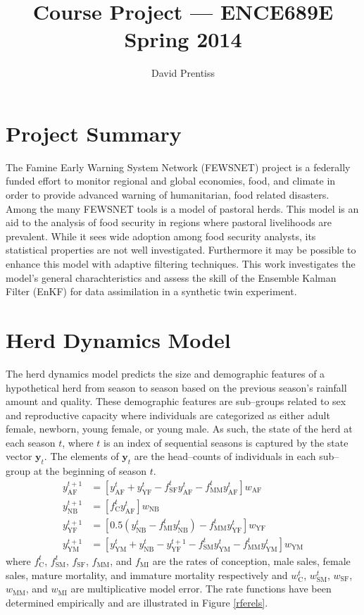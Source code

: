\documentclass[fleqn, letterpaper]{amsart}
\title{Course Project --- ENCE689E Spring 2014}
\author{David Prentiss}
\newcommand{\vecy}{\mathbf{y}}
\begin{document}
\maketitle

\section{Project Summary}

The Famine Early Warning System Network (FEWSNET) project is a federally funded effort to monitor regional and global economies, food, and climate in order to provide advanced warning of humanitarian, food related disasters.
Among the many FEWSNET tools is a model of pastoral herds. This model\cite{fewsnet} is an aid to the analysis of food security in regions where pastoral livelihoods are prevalent. While it sees wide adoption among food security analysts, its statistical properties are not well investigated.
Furthermore it may be possible to enhance this model with adaptive filtering techniques.
This work investigates the model's general charachteristics and assess the skill of the Ensemble Kalman Filter (EnKF) for data assimilation in a synthetic twin experiment.

\section{Herd Dynamics Model}

The herd dynamics model predicts the size and demographic features of a hypothetical herd from season to season based on the previous season's rainfall amount and quality.
These demographic features are sub--groups related to sex and reproductive capacity where individuals are categorized as either adult female, newborn, young female, or young male.
As such, the state of the herd at each season $t$, where $t$ is an index of sequential seasons is captured by the state vector $\vecy_t$.
The elements of $\vecy_t$ are the head--counts of individuals in each sub--group at the beginning of season $t$.
\begin{align}
y_{\text{AF}}^{t+1} &= [y_{\text{AF}}^t + y_{\text{YF}}^t - f_{\text{SF}}^ty_{\text{AF}}^t - f_{\text{MM}}^ty_{\text{AF}}^t]w_{\text{AF}}\\
y_{\text{NB}}^{t+1} &= [f_{\text{C}}^ty_{\text{AF}}^t]w_{\text{NB}}\\
y_{\text{YF}}^{t+1} &= [0.5(y_{\text{NB}}^t - f_{\text{MI}}^ty_{\text{NB}}^t) - f_{\text{MM}}^ty_{\text{YF}}^t]w_{\text{YF}}\\
y_{\text{YM}}^{t+1} &= [y_{\text{YM}}^t + y_{\text{NB}}^t - y_{\text{YF}}^{t+1} - f_{\text{SM}}^ty_{\text{YM}}^t - f_{\text{MM}}^ty_{\text{YM}}^t]w_{\text{YM}}
\end{align}
where $f_{\text{C}}^t$, $f_{\text{SM}}^t$, $f_{\text{SF}}$, $f_{\text{MM}}$, and $f_{\text{MI}}$ are the rates of conception, male sales, female sales, mature mortality, and immature mortality respectively and
$w_{\text{C}}^t$, $w_{\text{SM}}^t$, $w_{\text{SF}}$, $w_{\text{MM}}$, and $w_{\text{MI}}$
are multiplicative model error.
The rate functions have been determined empirically and are illustrated in Figure \ref{rferels}.
\end{document}
